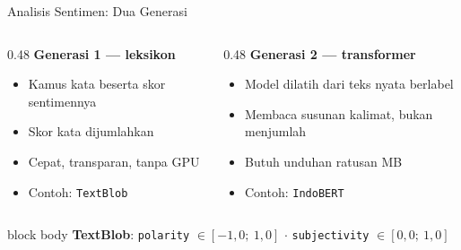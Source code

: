 \documentclass[aspectratio=169,t]{beamer}
\begin{document}
\begin{frame}{Analisis Sentimen: Dua Generasi}
  \begin{columns}[T]
    \begin{column}{0.48\textwidth}
      \textcolor{nvblue}{\textbf{Generasi 1 --- leksikon}}
      \begin{itemize}
        \footnotesize
        \item Kamus kata beserta skor sentimennya
        \item Skor kata dijumlahkan
        \item Cepat, transparan, tanpa GPU
        \item Contoh: \texttt{TextBlob}
      \end{itemize}
    \end{column}
    \begin{column}{0.48\textwidth}
      \textcolor{nvorange}{\textbf{Generasi 2 --- transformer}}
      \begin{itemize}
        \footnotesize
        \item Model dilatih dari teks nyata berlabel
        \item Membaca susunan kalimat, bukan menjumlah
        \item Butuh unduhan ratusan MB
        \item Contoh: \texttt{IndoBERT}
      \end{itemize}
    \end{column}
  \end{columns}
  \vspace{0.7em}
  \begin{beamercolorbox}[rounded=true,shadow=false,sep=4pt]{block body}
    \small\color{white}
    \textbf{TextBlob}: \texttt{polarity} $\in [-1{,}0;\ 1{,}0]$ \quad $\cdot$ \quad
    \texttt{subjectivity} $\in [0{,}0;\ 1{,}0]$
  \end{beamercolorbox}
\end{frame}
\end{document}
